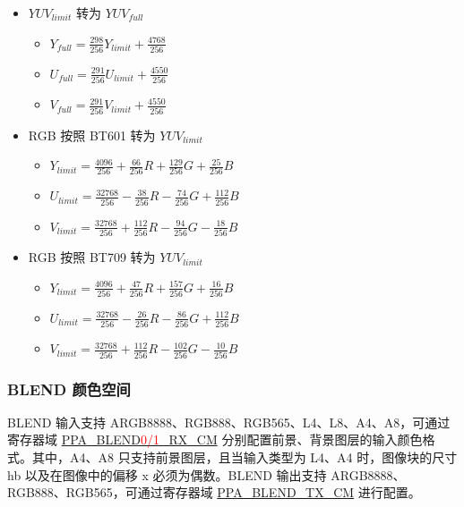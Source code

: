 \documentclass[main\_\_CN.tex]{subfiles}
\begin{document}
\begin{itemize}
    \item $YUV_{limit}$ 转为 $YUV_{full}$
        \begin{itemize}
            \item $Y_{full} = \frac{298}{256} Y_{limit} + \frac{4768}{256}$
            \item $U_{full} = \frac{291}{256} U_{limit} + \frac{4550}{256}$
            \item $V_{full} = \frac{291}{256} V_{limit} + \frac{4550}{256}$
        \end{itemize}
    \item RGB 按照 BT601 转为 $YUV_{limit}$
        \begin{itemize}
            \item $Y_{limit} = \frac{4096}{256} + \frac{66}{256}R + \frac{129}{256}G + \frac{25}{256}B$
            \item $U_{limit} = \frac{32768}{256} - \frac{38}{256}R - \frac{74}{256}G + \frac{112}{256}B$
            \item $V_{limit} = \frac{32768}{256} + \frac{112}{256}R - \frac{94}{256}G - \frac{18}{256}B$
        \end{itemize}
    \item RGB 按照 BT709 转为 $YUV_{limit}$
        \begin{itemize}
            \item $Y_{limit} = \frac{4096}{256} + \frac{47}{256}R + \frac{157}{256}G + \frac{16}{256}B$
            \item $U_{limit} = \frac{32768}{256} - \frac{26}{256}R - \frac{86}{256}G + \frac{112}{256}B$
            \item $V_{limit} = \frac{32768}{256} + \frac{112}{256}R - \frac{102}{256}G - \frac{10}{256}B$
        \end{itemize}
\end{itemize}

\subsubsection{BLEND 颜色空间}
\label{sec:blend-color-space}
BLEND 输入支持 ARGB8888、RGB888、RGB565、L4、L8、A4、A8，可通过寄存器域 \hyperref[fielddesc:PPABLEND0RXCM]{PPA\_BLEND\textcolor{red}{0/1}\_RX\_CM} 分别配置前景、背景图层的输入颜色格式。其中，A4、A8 只支持前景图层，且当输入类型为 L4、A4 时，图像块的尺寸 hb 以及在图像中的偏移 x 必须为偶数。BLEND 输出支持 ARGB8888、RGB888、RGB565，可通过寄存器域 \hyperref[fielddesc:PPABLENDTXCM]{PPA\_BLEND\_TX\_CM} 进行配置。
\end{document}
